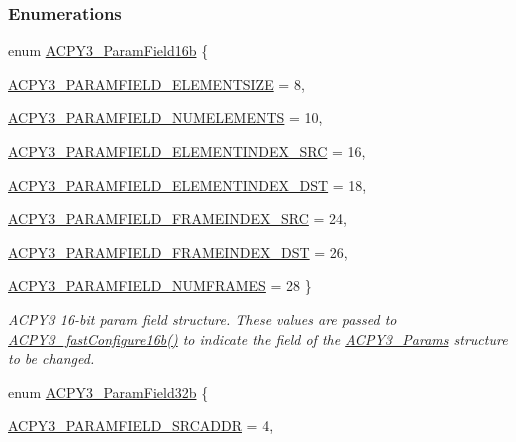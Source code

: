 \subsubsection*{Enumerations}
\begin{CompactItemize}
\item 
enum \hyperlink{group___d_s_p_a_c_p_y3_gf9624d3d925ec0d15bd845967664e608}{ACPY3\_\-Param\-Field16b} \{ \par
\hyperlink{group___d_s_p_a_c_p_y3_ggf9624d3d925ec0d15bd845967664e608f590c76a022dbe56043c8a0a577a88c8}{ACPY3\_\-PARAMFIELD\_\-ELEMENTSIZE} =  8, 
\par
\hyperlink{group___d_s_p_a_c_p_y3_ggf9624d3d925ec0d15bd845967664e608b95b07e80a06c8d2b0ccd191de1fb8aa}{ACPY3\_\-PARAMFIELD\_\-NUMELEMENTS} =  10, 
\par
\hyperlink{group___d_s_p_a_c_p_y3_ggf9624d3d925ec0d15bd845967664e608a3a4872acfc89e4da1820e0839b0fb87}{ACPY3\_\-PARAMFIELD\_\-ELEMENTINDEX\_\-SRC} =  16, 
\par
\hyperlink{group___d_s_p_a_c_p_y3_ggf9624d3d925ec0d15bd845967664e608a1c08ec69ae102d758b8678c492038e3}{ACPY3\_\-PARAMFIELD\_\-ELEMENTINDEX\_\-DST} =  18, 
\par
\hyperlink{group___d_s_p_a_c_p_y3_ggf9624d3d925ec0d15bd845967664e608cd1fe7c99a4596d8724a9cf359bf8f57}{ACPY3\_\-PARAMFIELD\_\-FRAMEINDEX\_\-SRC} =  24, 
\par
\hyperlink{group___d_s_p_a_c_p_y3_ggf9624d3d925ec0d15bd845967664e608ad2460b82b3834e625dcdb3e1e2c140c}{ACPY3\_\-PARAMFIELD\_\-FRAMEINDEX\_\-DST} =  26, 
\par
\hyperlink{group___d_s_p_a_c_p_y3_ggf9624d3d925ec0d15bd845967664e6085593f2242b7d6741c9dcb4233909942d}{ACPY3\_\-PARAMFIELD\_\-NUMFRAMES} =  28
 \}
\begin{CompactList}\small\item\em ACPY3 16-bit param field structure. These values are passed to \hyperlink{group___d_s_p_a_c_p_y3_g2c54ca4dc3d0cf3f861259bc7cf0f8de}{ACPY3\_\-fast\-Configure16b()} to indicate the field of the \hyperlink{struct_a_c_p_y3___params}{ACPY3\_\-Params} structure to be changed. \item\end{CompactList}\item 
enum \hyperlink{group___d_s_p_a_c_p_y3_g96f43d4bc010da2d1bb9dc08ea828de0}{ACPY3\_\-Param\-Field32b} \{ \par
\hyperlink{group___d_s_p_a_c_p_y3_gg96f43d4bc010da2d1bb9dc08ea828de0807013269912df7c5dbc2361483d2e1e}{ACPY3\_\-PARAMFIELD\_\-SRCADDR} =  4, 
\par

\end{CompactItemize}
